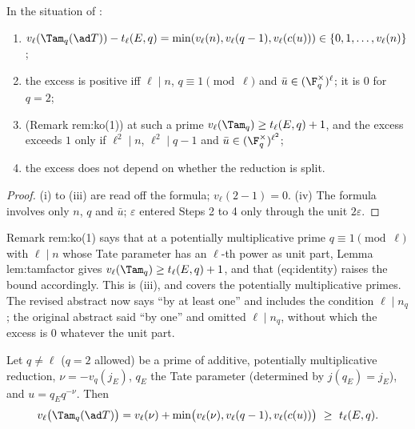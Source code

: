 \begin{corollary}[consequences]\label{cor:blochkato:tamfactor-consequences}
In the situation of :
\begin{enumerate}[label=(\roman*)]
\item $v_\ell(\Tam_q(\ad T))-t_\ell(E,q)=\min(v_\ell(n),v_\ell(q-1),v_\ell(c(u)))\in\{0,1,\dots,v_\ell(n)\}$;
\item the excess is positive iff $\ell\mid n$, $q\equiv1\pmod\ell$ and $\bar u\in(\F_q^\times)^\ell$; it is $0$ for $q=2$;
\item (Remark rem:ko(1)) at such a prime $v_\ell(\Tam_q)\ge t_\ell(E,q)+1$, and the excess exceeds $1$ only if $\ell^2\mid n$, $\ell^2\mid q-1$ and $\bar u\in(\F_q^\times)^{\ell^2}$;
\item the excess does not depend on whether the reduction is split.
\end{enumerate}
\end{corollary}

\begin{proof}
(i) to (iii) are read off the formula; $v_\ell(2-1)=0$. (iv) The formula involves only $n$, $q$ and $\bar u$; $\varepsilon$ entered Steps 2 to 4 only through the unit $2\varepsilon$.
\end{proof}

\begin{paperlink}
Remark rem:ko(1) says that at a potentially multiplicative prime $q\equiv1\pmod\ell$ with $\ell\mid n$ whose Tate parameter has an $\ell$-th power as unit part,
Lemma lem:tamfactor gives $v_\ell(\Tam_q)\ge t_\ell(E,q)+1$, and that (eq:identity) raises the bound accordingly. This is (iii), and  covers the potentially
multiplicative primes. The revised abstract now says ``by at least one'' and includes the condition $\ell\mid n_q$; the original abstract said ``by one'' and omitted
$\ell\mid n_q$, without which the excess is $0$ whatever the unit part.
\end{paperlink}

\begin{proposition}\label{prop:blochkato:tam-potmult}
Let $q\ne\ell$ ($q=2$ allowed) be a prime of additive, potentially multiplicative reduction, $\nu=-v_q(j_E)$, $q_E$ the Tate parameter (determined by $j(q_E)=j_E$), and
$u=q_Eq^{-\nu}$. Then
\[
v_\ell\bigl(\Tam_q(\ad T)\bigr)=v_\ell(\nu)+\min\bigl(v_\ell(\nu),v_\ell(q-1),v_\ell(c(u))\bigr)\ \ge\ t_\ell(E,q).
\]
\end{proposition}

